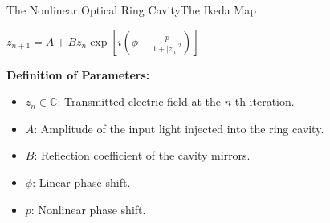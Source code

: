 \documentclass[aspectratio=169]{beamer}
\newcommand{\sectionimg}{} %
\newcommand{\setsectionimage}[1]{\renewcommand{\sectionimg}{#1}}
\begin{document}
\begin{frame}{The Nonlinear Optical Ring Cavity}{The Ikeda Map}
    \vspace{-3.5em}
\begin{block}{}
        \centering
        $z_{n+1} = A + B z_n \exp\left[i\left(\phi - \frac{p}{1+|z_n|^2}\right)\right]$
\end{block}
    \vspace{1.5em}
    \textbf{Definition of Parameters:}
    \begin{itemize}
        \item \textbf{$z_n \in \mathbb{C}$}: Transmitted electric field at the $n$-th
        iteration.
        \item \textbf{$A$}: Amplitude of the input light injected into the ring cavity.
        \item \textbf{$B$}: Reflection coefficient of the cavity mirrors.
        \item \textbf{$\phi$}: Linear phase shift.
        \item \textbf{$p$}: Nonlinear phase shift.
    \end{itemize}
    
    \vspace{0.5em}
\end{frame}

\setsectionimage{nvidia-cuda_logo.png}
\end{document}
